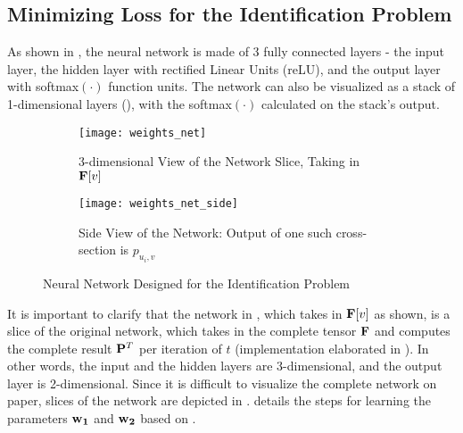 \subsection{Minimizing Loss for the Identification Problem} \label{sec:Minimizing Loss for the Identification Problem}
As shown in , the neural network is made of 3 fully connected layers - the input layer, the hidden layer with rectified Linear Units (reLU), and the output layer with softmax$(\cdot)$ function units. The network can also be visualized as a stack of 1-dimensional layers (), with the softmax$(\cdot)$ calculated on the stack's output.
\begin{figure}[!htbp]
    \centering
    \begin{subfigure}{\textwidth}
        \centering
        \texttt{[image: weights\_net]}
        \caption{3-dimensional View of the Network Slice, Taking in $\mathbf{F}[v]$}
        \label{fig:3-dimensional view of the network slice taking in Fv}
    \end{subfigure}
    \begin{subfigure}{.75\textwidth}
        \centering
        \texttt{[image: weights\_net\_side]}
        \caption{Side View of the Network: Output of one such cross-section is $p_{u_i, v}$}
        \label{fig:Side view of the network}
    \end{subfigure}
    \caption{Neural Network Designed for the Identification Problem}
    \label{fig:Neural network designed for the Identification Problem}
\end{figure}

It is important to clarify that the network in , which takes in $\mathbf{F}[v]$ as shown, is a slice of the original network, which takes in the complete tensor $\mathbf{F}$ and computes the complete result $\mathbf{P}^{T}$  per iteration of $t$ (implementation elaborated in ). In other words, the input and the hidden layers are 3-dimensional, and the output layer is 2-dimensional. Since it is difficult to visualize the complete network on paper, slices of the network are depicted in .  details the steps for learning the parameters $\mathbf{w_1}$ and $\mathbf{w_2}$ based on .


